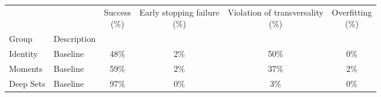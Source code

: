 \begin{tabular}{llcccc}
\toprule
          &          & \shortstack{Success \\(\%)} & \shortstack{Early stopping failure \\ (\%)} & \shortstack{Violation of transversality\\ (\%)} & \shortstack{Overfitting \\ (\%)} \\
Group & Description &                             &                                             &                                                 &                                  \\
\midrule
Identity & Baseline &                        48\% &                                         2\% &                                            50\% &                              0\% \\
Moments & Baseline &                        59\% &                                         2\% &                                            37\% &                              2\% \\
Deep Sets & Baseline &                        97\% &                                         0\% &                                             3\% &                              0\% \\
\bottomrule
\end{tabular}
